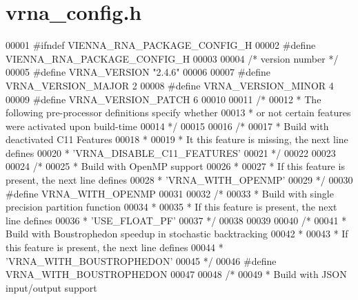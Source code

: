 \hypertarget{vrna__config_8h_source}{}\section{vrna\+\_\+config.\+h}
\label{vrna__config_8h_source}

\begin{DoxyCode}
00001 \textcolor{preprocessor}{#ifndef VIENNA\_RNA\_PACKAGE\_CONFIG\_H}
00002 \textcolor{preprocessor}{#define VIENNA\_RNA\_PACKAGE\_CONFIG\_H}
00003 
00004 \textcolor{comment}{/* version number */}
00005 \textcolor{preprocessor}{#define VRNA\_VERSION  "2.4.6"}
00006 
00007 \textcolor{preprocessor}{#define VRNA\_VERSION\_MAJOR  2}
00008 \textcolor{preprocessor}{#define VRNA\_VERSION\_MINOR  4}
00009 \textcolor{preprocessor}{#define VRNA\_VERSION\_PATCH  6}
00010 
00011 \textcolor{comment}{/*}
00012 \textcolor{comment}{ * The following pre-processor definitions specify whether}
00013 \textcolor{comment}{ * or not certain features were activated upon build-time}
00014 \textcolor{comment}{ */}
00015 
00016 \textcolor{comment}{/*}
00017 \textcolor{comment}{ * Build with deactivated C11 Features}
00018 \textcolor{comment}{ *}
00019 \textcolor{comment}{ * It this feature is missing, the next line defines}
00020 \textcolor{comment}{ * 'VRNA\_DISABLE\_C11\_FEATURES'}
00021 \textcolor{comment}{ */}
00022 
00023 
00024 \textcolor{comment}{/*}
00025 \textcolor{comment}{ * Build with OpenMP support}
00026 \textcolor{comment}{ *}
00027 \textcolor{comment}{ * If this feature is present, the next line defines}
00028 \textcolor{comment}{ * 'VRNA\_WITH\_OPENMP'}
00029 \textcolor{comment}{ */}
00030 \textcolor{preprocessor}{#define VRNA\_WITH\_OPENMP}
00031 
00032 \textcolor{comment}{/*}
00033 \textcolor{comment}{ * Build with single precision partition function}
00034 \textcolor{comment}{ *}
00035 \textcolor{comment}{ * If this feature is present, the next line defines}
00036 \textcolor{comment}{ * 'USE\_FLOAT\_PF'}
00037 \textcolor{comment}{ */}
00038 
00039 
00040 \textcolor{comment}{/*}
00041 \textcolor{comment}{ * Build with Boustrophedon speedup in stochastic backtracking}
00042 \textcolor{comment}{ *}
00043 \textcolor{comment}{ * If this feature is present, the next line defines}
00044 \textcolor{comment}{ * 'VRNA\_WITH\_BOUSTROPHEDON'}
00045 \textcolor{comment}{ */}
00046 \textcolor{preprocessor}{#define VRNA\_WITH\_BOUSTROPHEDON}
00047 
00048 \textcolor{comment}{/*}
00049 \textcolor{comment}{ * Build with JSON input/output support}

\end{DoxyCode}
